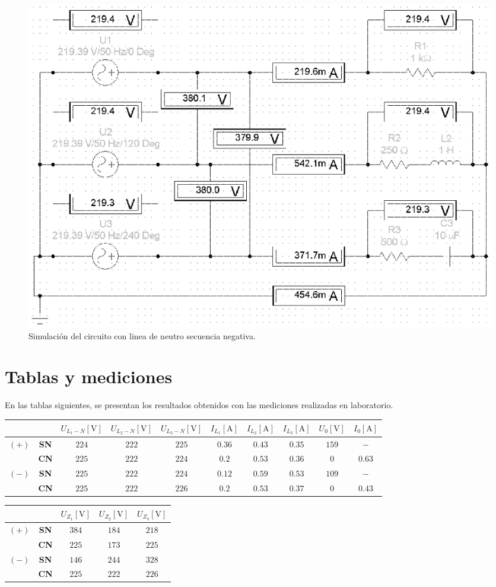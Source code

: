 \documentclass[letter,11pt]{article}
\begin{document}
\begin{figure}[!h]
\centering
\includegraphics[scale=0.99]{simulacion/practica3.4.eps}
\caption{Simulación del circuito con linea de neutro secuencia negativa.}
\label{simulacion4}
\end{figure}

\section{Tablas y mediciones}
En las tablas siguientes, se presentan los resultados obtenidos con las
mediciones realizadas en laboratorio.

\begin{center}
    \begin{tabular}{|c|c||c|c|c||c|c|c||c|c|}
    \hline
    \multicolumn{2}{|c||}{} &
    $U_{L_1-N}[\text{V}]$ & $U_{L_2-N}[\text{V}]$ & $U_{L_3-N}[\text{V}]$ &
    $I_{L_1}[\text{A}]$ & $I_{L_2}[\text{A}]$ & $I_{L_3}[\text{A}]$ &
    $U_0[\text{V}]$ & $I_0[\text{A}]$
    \tabularnewline \hline \hline
    $(+)$ & \textbf{SN} & $224$ & $222$ & $225$ & $0.36$ & $0.43$ & $0.35$ & $159$ & $-$
    \tabularnewline \hline
          & \textbf{CN} & $225$ & $222$ & $224$ & $0.2$ & $0.53$ & $0.36$ & $0$ & $0.63$
    \tabularnewline \hline
    $(-)$ & \textbf{SN} & $225$ & $222$ & $224$ & $0.12$ & $0.59$ & $0.53$ & $109$ & $-$
    \tabularnewline \hline
          & \textbf{CN} & $225$ & $222$ & $226$ & $0.2$ & $0.53$ & $0.37$ & $0$ & $0.43$
    \tabularnewline \hline
    \end{tabular}
\end{center}

\begin{center}
    \begin{tabular}{|c|c||c|c|c|}
    \hline
    \multicolumn{2}{|c||}{} &
    $U_{Z_1}[\text{V}]$ & $U_{Z_2}[\text{V}]$ & $U_{Z_3}[\text{V}]$
    \tabularnewline \hline \hline
    $(+)$ & \textbf{SN} & $384$ & $184$ & $218$
    \tabularnewline \hline
          & \textbf{CN} & $225$ & $173$ & $225$
    \tabularnewline \hline
    $(-)$ & \textbf{SN} & $146$ & $244$ & $328$
    \tabularnewline \hline
          & \textbf{CN} & $225$ & $222$ & $226$
    \tabularnewline \hline
    \end{tabular}
\end{center}
\end{document}
